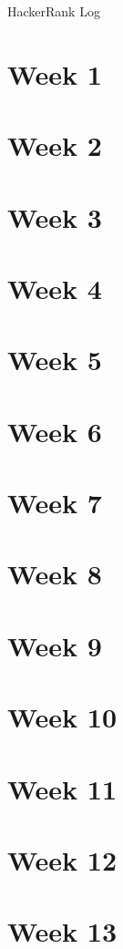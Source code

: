 \documentclass[9pt]{extarticle}
\begin{document}
\begin{titlepage}
    HackerRank Log
\end{titlepage}
\tableofcontents
\newpage

\section{Week 1}
\newpage

\section{Week 2 }
\newpage


\section{Week 3}
\newpage


\section{Week 4}
\newpage


\section{Week 5}
\newpage

\section{Week 6}
\newpage

\section{Week 7}
\newpage

\section{Week 8}
\newpage

\section{Week 9}
\newpage

\section{Week 10}
\newpage

\section{Week 11 }
\newpage


\section{Week 12 }
\newpage


\section{Week 13}
\newpage
\end{document}
